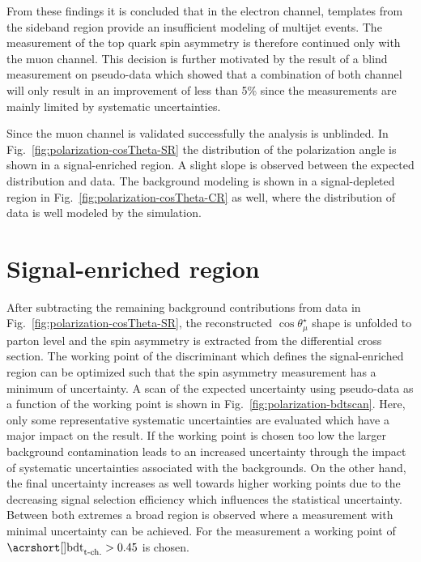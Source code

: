 From these findings it is concluded that in the electron channel, templates from the sideband region provide an insufficient modeling of multijet events. The measurement of the top quark spin asymmetry is therefore continued only with the muon channel. This decision is further motivated by the result of a blind measurement on pseudo-data which showed that a combination of both channel will only result in an improvement of less than 5\% since the measurements are mainly limited by systematic uncertainties.

Since the muon channel is validated successfully the analysis is unblinded. In Fig.~\ref{fig:polarization-cosTheta-SR} the distribution of the polarization angle is shown in a signal-enriched region. A slight slope is observed between the expected distribution and data. The background modeling is shown in a signal-depleted region in Fig.~\ref{fig:polarization-cosTheta-CR} as well, where the distribution of data is well modeled by the simulation.



\section{Signal-enriched region}
\label{sec:polarization-optimization}

After subtracting the remaining background contributions from data in Fig.~\ref{fig:polarization-cosTheta-SR}, the reconstructed $\cos\theta_{\mu}^\star$ shape is unfolded to parton level and the spin asymmetry is extracted from the differential cross section. The working point of the \bdttch discriminant which defines the signal-enriched region can be optimized such that the spin asymmetry measurement has a minimum of uncertainty. A scan of the expected uncertainty using pseudo-data as a function of the \bdttch working point is shown in Fig.~\ref{fig:polarization-bdtscan}. Here, only some representative systematic uncertainties are evaluated which have a major impact on the result. If the working point is chosen too low the larger background contamination leads to an increased uncertainty through the impact of systematic uncertainties associated with the backgrounds. On the other hand, the final uncertainty increases as well towards higher working points due to the decreasing signal selection efficiency which influences the statistical uncertainty. Between both extremes a broad region is observed where a measurement with minimal uncertainty can be achieved. For the measurement a working point of $\bdttch>0.45$ is chosen. 

